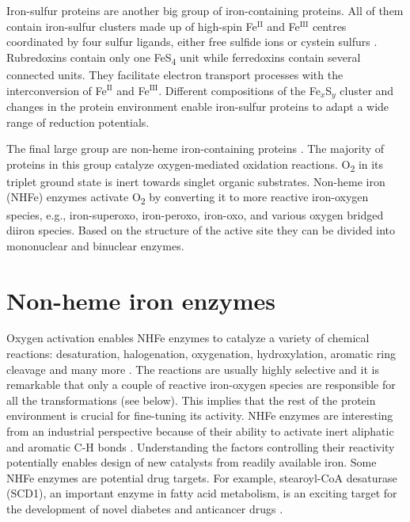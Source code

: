 Iron-sulfur proteins are another big group of iron-containing proteins. All of them contain iron-sulfur clusters made up of high-spin Fe$^{\mathrm{II}}$ and Fe$^{\mathrm{III}}$ centres coordinated by four sulfur ligands, either free sulfide ions or cystein sulfurs \cite{inorganic_chemistry_book}. Rubredoxins contain only one FeS\textsubscript{4} unit while ferredoxins contain several connected units. They facilitate electron transport processes with the interconversion of Fe$^{\mathrm{II}}$ and Fe$^{\mathrm{III}}$. Different compositions of the Fe$_x$S$_y$ cluster and changes in the protein environment enable iron-sulfur proteins to adapt a wide range of reduction potentials.

The final large group are non-heme iron-containing proteins \cite{Solomon2000}. The majority of proteins in this group catalyze oxygen-mediated oxidation  reactions. O\textsubscript{2} in its triplet ground state is inert towards singlet organic substrates. Non-heme iron (NHFe) enzymes activate O\textsubscript{2} by converting it to more reactive iron-oxygen species, e.g., iron-superoxo, iron-peroxo, iron-oxo, and various oxygen bridged diiron species. Based on the structure of the active site they can be divided into mononuclear and binuclear enzymes. 


\section{Non-heme iron enzymes}
Oxygen activation enables NHFe enzymes to catalyze a variety of chemical reactions: desaturation, halogenation, oxygenation, hydroxylation, aromatic ring cleavage and many more \cite{Solomon2016,Jasniewski2018}. The reactions are usually highly selective and it is remarkable that only a couple of reactive iron-oxygen species are responsible for all the transformations (see below). This implies that the rest of the protein environment is crucial for fine-tuning its activity. NHFe enzymes are interesting from an industrial perspective because of their ability to activate inert aliphatic and aromatic C-H bonds \cite{Shilov1997}. Understanding the factors controlling their reactivity potentially enables design of new catalysts from readily available iron. Some NHFe enzymes are potential drug targets. For example, stearoyl-CoA desaturase (SCD1), an important enzyme in fatty acid metabolism, is an exciting target for the development of novel diabetes and anticancer drugs \cite{Dobrzyn2005,Gaszewska2019}.



